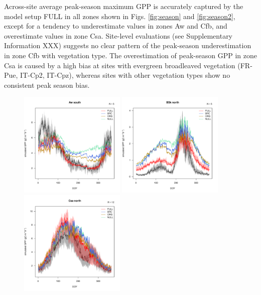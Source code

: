 \documentclass{myreport}
\begin{document}
Across-site average peak-season maximum GPP is accurately captured by the model setup FULL in all zones shown in Figs. \ref{fig:season} and \ref{fig:season2}, except for a tendency to underestimate values in zones Aw and Cfb, and overestimate values in zone Csa. Site-level evaluations (see Supplementary Information XXX) suggests no clear pattern of the peak-season underestimation in zone Cfb with vegetation type. The overestimation of peak-season GPP in zone Csa is caused by a high bias at sites with evergreen broadleaved vegetation (FR-Pue, IT-Cp2, IT-Cpz), whereas sites with other vegetation types show no consistent peak season bias. 

 \begin{figure}[!ht]
\includegraphics[width=0.45\textwidth]{fig/meandoy_byzone_Aw_south_.pdf}
\includegraphics[width=0.45\textwidth]{fig/meandoy_byzone_BSk_north_.pdf}\\
\includegraphics[width=0.45\textwidth]{fig/meandoy_byzone_Csa_north_.pdf}

\end{figure}
\end{document}

